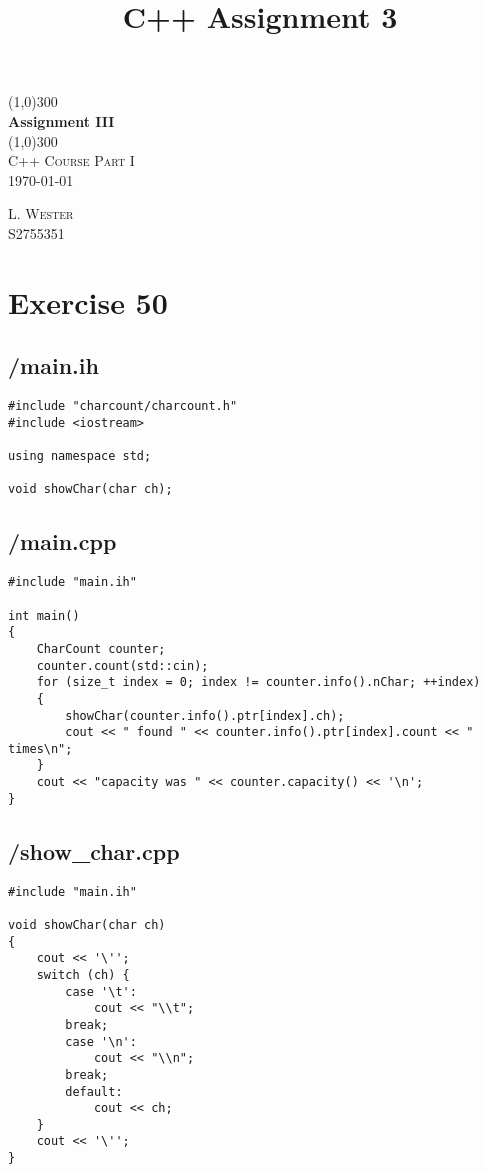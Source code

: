 \documentclass{article}
\title{C++ Assignment 3}
\begin{document}
\begin{titlepage}
    \begin{center}
        \line(1,0){300}\\
        [0.65cm]
        \huge{\bfseries Assignment III}\\
        \line(1,0){300}\\
        \textsc{\Large C++ Course Part I}\\
        \textsc{\LARGE \today}\\
        [5.5cm]     
    \end{center}
    \begin{flushright}
        \textsc{\Large L. Wester\\S2755351}\\
        [0.5cm]
    \end{flushright}
\end{titlepage}
\section*{Exercise 50}
\subsection*{/main.ih}
\begin{verbatim}
#include "charcount/charcount.h"
#include <iostream>

using namespace std;

void showChar(char ch);
\end{verbatim}
\subsection*{/main.cpp}
\begin{verbatim}
#include "main.ih"

int main()
{
    CharCount counter;
    counter.count(std::cin);
    for (size_t index = 0; index != counter.info().nChar; ++index)
    {
        showChar(counter.info().ptr[index].ch);
        cout << " found " << counter.info().ptr[index].count << " times\n";
    }
    cout << "capacity was " << counter.capacity() << '\n';
}

\end{verbatim}
\subsection*{/show\_char.cpp}
\begin{verbatim}
#include "main.ih"

void showChar(char ch)
{
    cout << '\'';
    switch (ch) {
        case '\t':
            cout << "\\t";
        break;
        case '\n':
            cout << "\\n";
        break;
        default:
            cout << ch;
    }
    cout << '\'';
}
\end{verbatim}
\end{document}
